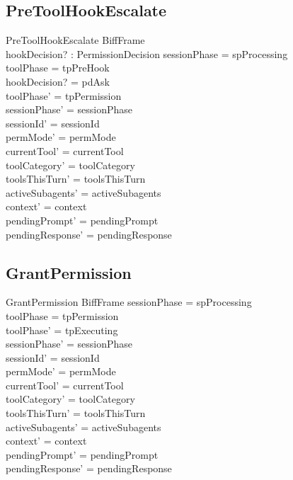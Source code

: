 \documentclass[a4paper,10pt,fleqn]{article}
\begin{document}
\subsection{PreToolHookEscalate}

\begin{schema}{PreToolHookEscalate}
  BiffFrame \\
  hookDecision? : PermissionDecision
  \where
  sessionPhase = spProcessing \\
  toolPhase = tpPreHook \\
  hookDecision? = pdAsk \\
  toolPhase' = tpPermission \\
  sessionPhase' = sessionPhase \\
  sessionId' = sessionId \\
  permMode' = permMode \\
  currentTool' = currentTool \\
  toolCategory' = toolCategory \\
  toolsThisTurn' = toolsThisTurn \\
  activeSubagents' = activeSubagents \\
  context' = context \\
  pendingPrompt' = pendingPrompt \\
  pendingResponse' = pendingResponse
\end{schema}

\subsection{GrantPermission}

\begin{schema}{GrantPermission}
  BiffFrame
  \where
  sessionPhase = spProcessing \\
  toolPhase = tpPermission \\
  toolPhase' = tpExecuting \\
  sessionPhase' = sessionPhase \\
  sessionId' = sessionId \\
  permMode' = permMode \\
  currentTool' = currentTool \\
  toolCategory' = toolCategory \\
  toolsThisTurn' = toolsThisTurn \\
  activeSubagents' = activeSubagents \\
  context' = context \\
  pendingPrompt' = pendingPrompt \\
  pendingResponse' = pendingResponse
\end{schema}
\end{document}
